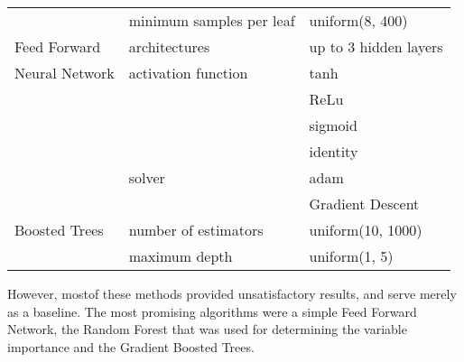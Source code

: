 \begin{table}
\begin{tabular}{lll}
                            & minimum samples per leaf    & uniform(8, 400)                        \\
Feed Forward                & architectures               & up to 3 hidden layers                  \\
Neural Network              & activation function         & tanh \\
                            &                             & ReLu \\ 
                            &                             & sigmoid \\
                            &                             & identity       \\
                            & solver                      & adam \\
                            &                             & Gradient Descent     \\
Boosted Trees               & number of estimators        & uniform(10, 1000)                      \\
                            & maximum depth               & uniform(1, 5)                         
\end{tabular}
\end{table}



However, mostof these methods provided unsatisfactory results, and serve merely as a baseline. The most promising algorithms were a simple Feed Forward Network, the Random Forest that was used for determining the variable importance and the Gradient Boosted Trees.